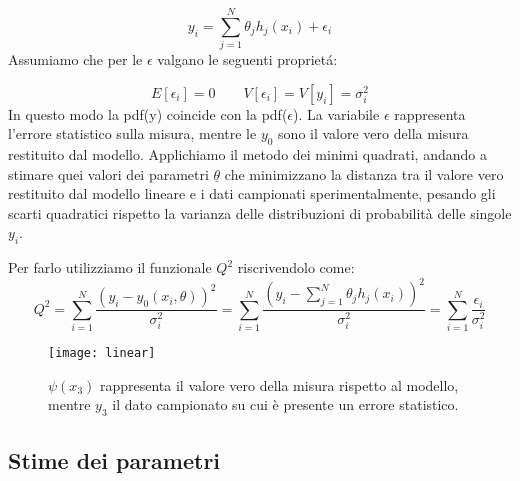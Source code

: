 \documentclass[11pt,a4paper]{book}
\begin{document}
\begin{equation}
	y_i = \sum_{j = 1}^N \theta_{j}h_{j}(x_i) + \epsilon_i
\end{equation}
Assumiamo che per le $\epsilon$ valgano le seguenti propriet\'{a}:

\begin{equation*}
	E[\epsilon_i] = 0 \quad \quad V[\epsilon_i]= V[y_i] = \sigma_i^2
\end{equation*}
In questo modo la pdf(y) coincide con la pdf($\epsilon$). La variabile $\epsilon$ rappresenta l'errore statistico sulla misura, mentre le $y_0$ sono il valore vero della misura restituito dal modello.
\newline
Applichiamo il metodo dei minimi quadrati, andando a stimare quei valori dei parametri $\underline{\theta}$ che minimizzano la distanza tra il valore vero restituito dal modello lineare e i dati campionati sperimentalmente, pesando gli scarti quadratici rispetto la varianza delle distribuzioni di probabilit\`{a} delle singole $y_i$.

\noindent Per farlo utilizziamo il funzionale $Q^2$ riscrivendolo come:
\begin{equation}
	Q^2 = \sum_{i=1}^N \dfrac{(y_i - y_0(x_i, \theta))^2}{\sigma_i^2} = \sum_{i=1}^N \dfrac{(y_i - \sum_{j=1}^N \theta_j h_j(x_i))^2}{\sigma_i^2} = \sum_{i=1}^N \dfrac{\epsilon_i}{\sigma^2_i} 
\end{equation}
\begin{figure}[ht]
\texttt{[image: linear]}	
\centering
\vspace{0.2in}
\caption{$\psi(x_3)$ rappresenta il valore vero della misura rispetto al modello, mentre $y_3$ il dato campionato su cui \`{e} presente un errore statistico.}
\end{figure}
\subsection{Stime dei parametri}
\end{document}

